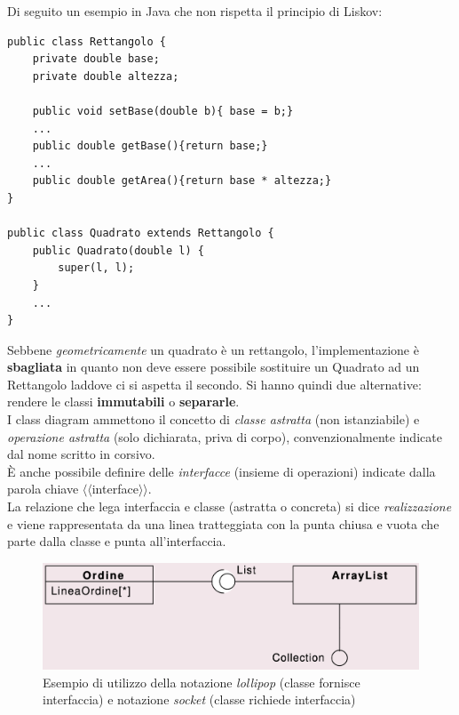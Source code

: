 \newpage
Di seguito un esempio in Java che non rispetta il principio di Liskov:
\begin{verbatim}
public class Rettangolo {
    private double base;
    private double altezza;

    public void setBase(double b){ base = b;}
    ...
    public double getBase(){return base;}
    ...
    public double getArea(){return base * altezza;}
}

public class Quadrato extends Rettangolo {
    public Quadrato(double l) {
        super(l, l);
    }
    ...
}
\end{verbatim}
Sebbene \textit{geometricamente} un quadrato è un rettangolo, l'implementazione è \textbf{sbagliata} in quanto non deve essere possibile sostituire un Quadrato ad un Rettangolo laddove ci si aspetta il secondo. Si hanno quindi due alternative: rendere le classi \textbf{immutabili} o \textbf{separarle}.
\\
I class diagram ammettono il concetto di \textit{classe astratta} (non istanziabile) e \textit{operazione astratta} (solo dichiarata, priva di corpo), convenzionalmente indicate dal nome scritto in corsivo.
\\
È anche possibile definire delle \textit{interfacce} (insieme di operazioni) indicate dalla parola chiave $\langle\langle$interface$\rangle\rangle$.
\\
La relazione che lega interfaccia e classe (astratta o concreta) si dice \textit{realizzazione} e viene rappresentata da una linea tratteggiata con la punta chiusa e vuota che parte dalla classe e punta all'interfaccia.

\begin{figure}[h!]
    \centering
    \includegraphics[width=0.75\linewidth]{assets/UML/class/class-9.png}
    \caption{Esempio di utilizzo della notazione \textit{lollipop} (classe fornisce interfaccia) e notazione \textit{socket} (classe richiede interfaccia)}
\end{figure}

